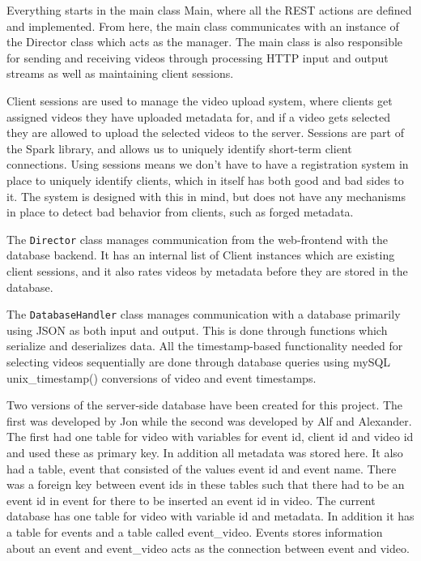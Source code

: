 \documentclass[conference]{IEEEtran}
\begin{document}
Everything starts in the main class Main, where all the REST actions are defined and implemented. From here,
the main class communicates with an instance of the Director class which acts as the manager. The main
class is also responsible for sending and receiving videos through processing HTTP input and output streams
as well as maintaining client sessions.

Client sessions are used to manage the video upload system, where clients get assigned videos they have uploaded
metadata for, and if a video gets selected they are allowed to upload the selected videos to the server.
Sessions are part of the Spark library, and allows us to uniquely identify short-term client connections. Using
sessions means we don't have to have a registration system in place to uniquely identify clients, which in itself
has both good and bad sides to it. The system is designed with this in mind, but does not have any mechanisms in
place to detect bad behavior from clients, such as forged metadata.

The \texttt{Director} class manages communication from the web-frontend with the database backend. It has an internal list
of Client instances which are existing client sessions, and it also rates videos by metadata before they are
stored in the database.

The \texttt{DatabaseHandler} class manages communication with a database primarily using JSON as both input and output.
This is done through functions which serialize and deserializes data. All the timestamp-based functionality needed
for selecting videos sequentially are done through database queries using mySQL unix\_timestamp() conversions of
video and event timestamps.

Two versions of the server-side database have been created for this project. The first was developed by Jon while the 
second was developed by Alf and Alexander. The first had one table for video with variables for event id, client id 
and video id and used these as primary key. In addition all metadata was stored here. It also had a table, event that 
consisted of the values event id and event name. There was a foreign key between event ids in these tables such that there 
had to be an event id in event for there to be inserted an event id in video.
The current database has one table for video with variable id and metadata. In addition it has a table for events and a table 
called event\_video. Events stores information about an event and event\_video acts as the connection between event and video.
\end{document}
